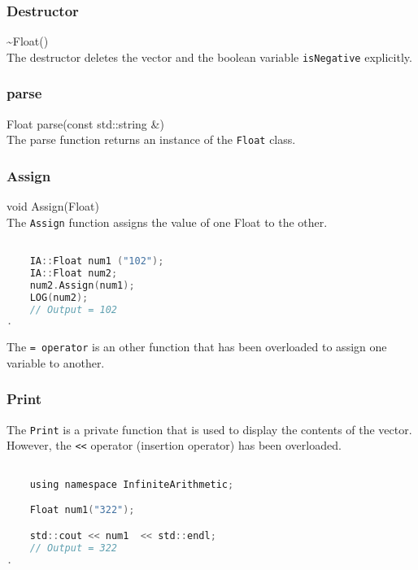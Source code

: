 \subsubsection{Destructor}  \vspace*{0.5em}

{\ttfamily \large \~{}Float()} \\[2mm]
The destructor deletes the vector and the boolean variable \verb|isNegative| explicitly.


\subsubsection{parse} 

{\ttfamily \large Float parse(const std::string \&)} \\[2mm]
The parse function returns an instance of the \verb|Float| class.

\subsubsection{Assign}  
{\ttfamily \large void Assign(Float)} \\[2mm]
The \verb|Assign| function assigns the value of one Float to the other.
\vspace*{1em}
\begin{lstlisting}[language = C]	

	IA::Float num1 ("102");
	IA::Float num2;
	num2.Assign(num1);
	LOG(num2);
	// Output = 102
.
\end{lstlisting}
\vspace*{1em}

The \verb|= operator| is an other function that has been overloaded to assign one variable to another.


\subsubsection{Print}
The \verb|Print| is a private function that is used to display the contents of the vector. \\
However, the \verb|<<| operator (insertion operator) has been overloaded.
\vspace*{1em}
\begin{lstlisting}[language = C]

	using namespace InfiniteArithmetic;

	Float num1("322");

	std::cout << num1  << std::endl; 
	// Output = 322
.
\end{lstlisting}
\vspace*{1em}

